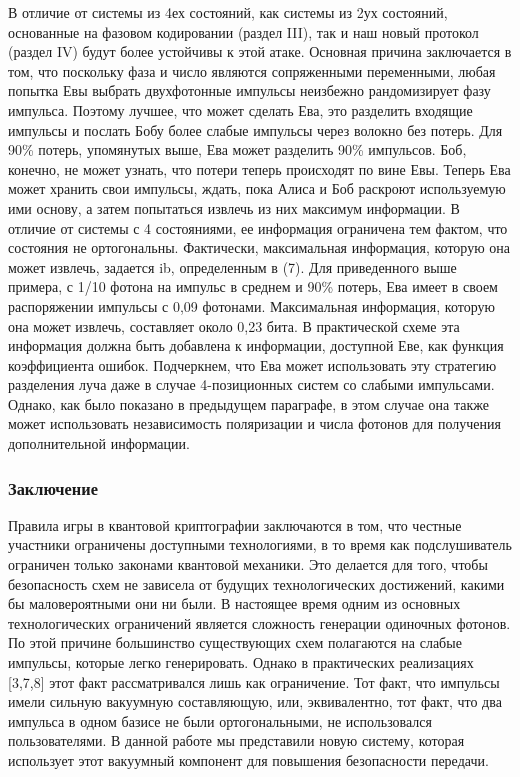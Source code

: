 В отличие от системы из 4ех состояний, как системы из 2ух состояний, основанные на фазовом кодировании (раздел III), так и наш новый протокол (раздел IV) будут более устойчивы к этой атаке. Основная причина заключается в том, что поскольку фаза и число являются сопряженными переменными, любая попытка Евы выбрать двухфотонные импульсы неизбежно рандомизирует фазу импульса. Поэтому лучшее, что может сделать Ева, это разделить входящие импульсы и послать Бобу более слабые импульсы через волокно без потерь. Для 90\% потерь, упомянутых выше, Ева может разделить 90\% импульсов. Боб, конечно, не может узнать, что потери теперь происходят по вине Евы. Теперь Ева может хранить свои импульсы, ждать, пока Алиса и Боб раскроют используемую ими основу, а затем попытаться извлечь из них максимум информации. В отличие от системы с 4 состояниями, ее информация ограничена тем фактом, что состояния не ортогональны. Фактически, максимальная информация, которую она может извлечь, задается ib, определенным в (7). Для приведенного выше примера, с 1/10 фотона на импульс в среднем и 90\% потерь, Ева имеет в своем распоряжении импульсы с 0,09 фотонами. Максимальная информация, которую она может извлечь, составляет около 0,23 бита. В практической схеме эта информация должна быть добавлена к информации, доступной Еве, как функция коэффициента ошибок. Подчеркнем, что Ева может использовать эту стратегию разделения луча даже в случае 4-позиционных систем со слабыми импульсами. Однако, как было показано в предыдущем параграфе, в этом случае она также может использовать независимость поляризации и числа фотонов для получения дополнительной информации. 


\subsubsection{Заключение}

Правила игры в квантовой криптографии заключаются в том, что честные участники ограничены доступными технологиями, в то время как подслушиватель ограничен только законами квантовой механики. Это делается для того, чтобы безопасность схем не зависела от будущих технологических достижений, какими бы маловероятными они ни были. В настоящее время одним из основных технологических ограничений является сложность генерации одиночных фотонов. По этой причине большинство существующих схем полагаются на слабые импульсы, которые легко генерировать. Однако в практических реализациях [3,7,8] этот факт рассматривался лишь как ограничение. Тот факт, что импульсы имели сильную вакуумную составляющую, или, эквивалентно, тот факт, что два импульса в одном базисе не были ортогональными, не использовался пользователями. В данной работе мы представили новую систему, которая использует этот вакуумный компонент для повышения безопасности передачи.

